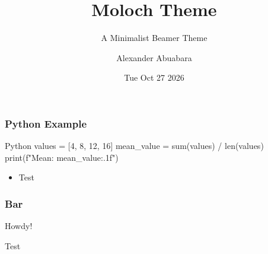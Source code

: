 \documentclass{beamer}
\title{Moloch Theme}
\subtitle{A Minimalist Beamer Theme}
\author{Alexander Abuabara}
\institute{Texas A\&M University}
\date{Tue Oct 27 2026}
\begin{document}
\maketitle

\begin{frame}[fragile]
\frametitle{Python Example}

\begin{code}{Python}
values = [4, 8, 12, 16]
mean_value = sum(values) / len(values)
print(f"Mean: {mean_value:.1f}")
\end{code}

\begin{itemize}
\item Test
\end{itemize}

\end{frame}

\begin{frame}
\frametitle{Bar}
Howdy!
\end{frame}

\begin{frame}
Test
\end{frame}
\end{document}
